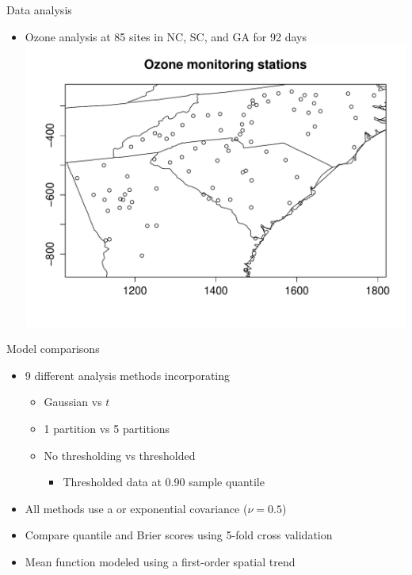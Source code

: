 \documentclass{beamer}
\begin{document}
\begin{frame}{Data analysis}
  \begin{itemize} \setlength{\itemsep}{0.5em}
    \item Ozone analysis at 85 sites in NC, SC, and GA for 92 days
    \includegraphics[width=1\linewidth]{./plots/ozone_station.pdf}
  \end{itemize}
\end{frame}

\begin{frame}{Model comparisons}
  \begin{itemize} \setlength{\itemsep}{0.5em}
    \item 9 different analysis methods incorporating
    \begin{itemize}
      \item Gaussian vs $t$
      \item 1 partition vs 5 partitions
      \item No thresholding vs thresholded
      \begin{itemize}
        \item Thresholded data at 0.90 sample quantile
      \end{itemize}
    \end{itemize}
    \item All methods use a \Matern or exponential covariance ($\nu = 0.5$)
    \item Compare quantile and Brier scores using 5-fold cross validation
    \item Mean function modeled using a first-order spatial trend
  \end{itemize}
\end{frame}
\end{document}
